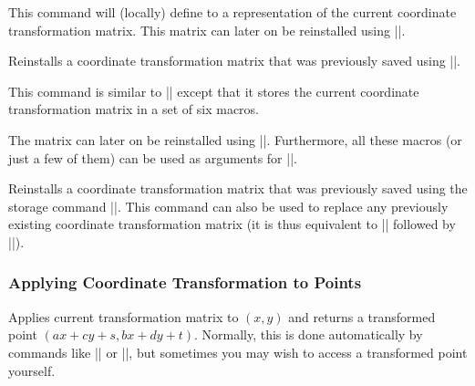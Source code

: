 \begin{command}{\pgfgettransform{}}
    This command will (locally) define  to a representation of the
    current coordinate transformation matrix. This matrix can later on be
    reinstalled using |\pgfsettransform|.
\end{command}

\begin{command}{\pgfsettransform{}}
    Reinstalls a coordinate transformation matrix that was previously saved
    using |\pgfgettransform|.
\end{command}

\begin{command}{\pgfgettransformentries{}%
}
    This command is similar to |\pgfgettransform| except that it stores the
    current coordinate transformation matrix in a set of six macros.

    The matrix can later on be reinstalled using |\pgfsettransformentries|.
    Furthermore, all these macros (or just a few of them) can be used as
    arguments for |\pgftransformcm|.
\end{command}

\begin{command}{\pgfsettransformentries{}}
    Reinstalls a coordinate transformation matrix that was previously saved
    using the storage command |\pgfgettransformentries|. This command can also
    be used to replace any previously existing coordinate transformation matrix
    (it is thus equivalent to |\pgftransformreset| followed by
    |\pgftransformcm|).
\end{command}


\subsubsection{Applying Coordinate Transformation to Points}

\begin{command}{\pgfpointtransformed{}}
    Applies current transformation matrix to  $(x,y)$ and returns a
    transformed point $(ax+cy+s,bx+dy+t)$. Normally, this is done automatically
    by commands like |\pgfpathlineto| or |\pgfpathmoveto|, but sometimes you
    may wish to access a transformed point yourself.
\end{command}


